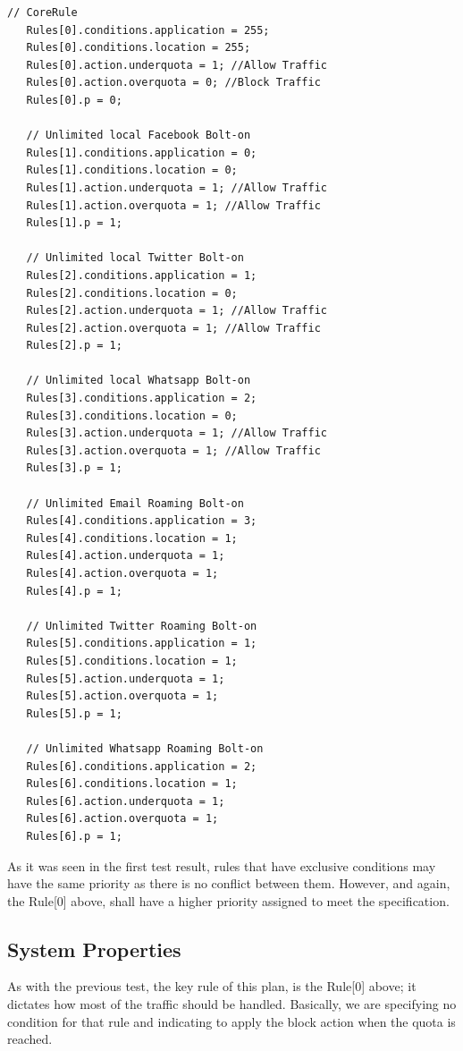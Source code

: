 \singlespacing
\begin{lstlisting}[caption=Core-Rules-based Roaming Plan Model,
  label=RoamingRules_Listing]
   // CoreRule
   Rules[0].conditions.application = 255;
   Rules[0].conditions.location = 255;
   Rules[0].action.underquota = 1; //Allow Traffic
   Rules[0].action.overquota = 0; //Block Traffic
   Rules[0].p = 0; 
   
   // Unlimited local Facebook Bolt-on
   Rules[1].conditions.application = 0;
   Rules[1].conditions.location = 0;
   Rules[1].action.underquota = 1; //Allow Traffic
   Rules[1].action.overquota = 1; //Allow Traffic
   Rules[1].p = 1;

   // Unlimited local Twitter Bolt-on
   Rules[2].conditions.application = 1;
   Rules[2].conditions.location = 0;
   Rules[2].action.underquota = 1; //Allow Traffic
   Rules[2].action.overquota = 1; //Allow Traffic
   Rules[2].p = 1;

   // Unlimited local Whatsapp Bolt-on
   Rules[3].conditions.application = 2;
   Rules[3].conditions.location = 0;
   Rules[3].action.underquota = 1; //Allow Traffic
   Rules[3].action.overquota = 1; //Allow Traffic
   Rules[3].p = 1;
   
   // Unlimited Email Roaming Bolt-on
   Rules[4].conditions.application = 3;
   Rules[4].conditions.location = 1;
   Rules[4].action.underquota = 1;
   Rules[4].action.overquota = 1;
   Rules[4].p = 1;

   // Unlimited Twitter Roaming Bolt-on
   Rules[5].conditions.application = 1;
   Rules[5].conditions.location = 1;
   Rules[5].action.underquota = 1;
   Rules[5].action.overquota = 1;
   Rules[5].p = 1;

   // Unlimited Whatsapp Roaming Bolt-on
   Rules[6].conditions.application = 2;
   Rules[6].conditions.location = 1;
   Rules[6].action.underquota = 1;
   Rules[6].action.overquota = 1;
   Rules[6].p = 1;

\end{lstlisting}
\doublespacing

As it was seen in the first test result, rules that have exclusive conditions may have the same priority as there is no conflict between them. However, and again, the Rule[0] above, shall have a higher priority assigned to meet the specification. \\

\subsection{System Properties}
\noindent As with the previous test, the key rule of this plan, is the Rule[0] above; it dictates how most of the traffic should be handled. Basically, we are specifying no condition for that rule and indicating to apply the block action when the quota is reached.  \\

